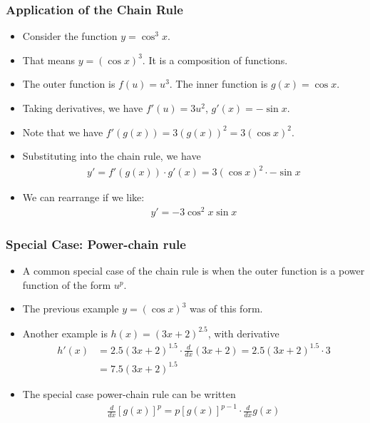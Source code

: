 \documentclass[serif,ignorenonframetext]{beamer}
\begin{document}
\begin{frame}
  \frametitle{Application of the Chain Rule}
  \begin{itemize}[<+->]
  \item Consider the function $y=\cos^3 x$.
  \item That means $y=(\cos x)^3$.  It is a composition of functions.
  \item The outer function is $f(u)=u^3$.  The inner function is $g(x)=\cos x$.
  \item Taking derivatives, we have $f'(u)=3u^2$, $g'(x)=-\sin x$.
  \item Note that we have $f'(g(x))= 3\left(g(x)\right)^2 = 3(\cos x)^2$.
  \item Substituting into the chain rule, we have
    \begin{align*}
      y' = f'(g(x)) \cdot g'(x)
      = 3(\cos x)^2 \cdot -\sin x
    \end{align*}
  \item We can rearrange if we like:
    \begin{align*}
      y' = -3 \cos^2 x \sin x
    \end{align*}
  \end{itemize}
\end{frame}

\begin{frame}
  \frametitle{Special Case: Power-chain rule}
  \begin{itemize}[<+->]
  \item A common special case of the chain rule is when the outer function
    is a power function of the form $u^p$.
  \item The previous example $y= (\cos x)^3$ was of this form.
  \item Another example is $h(x) = (3x+2)^{2.5}$, with derivative
    \begin{align*}
      h'(x)&=2.5(3x+2)^{1.5} \cdot \frac{d}{dx} (3x+2)
      = 2.5(3x+2)^{1.5} \cdot 3 \\
      &= 7.5 (3x+2)^{1.5}
    \end{align*}
  \item The special case power-chain rule can be written
    \begin{align*}
      \frac{d}{dx} [g(x)]^p = p [g(x)]^{p-1} \cdot \frac{d}{dx} g(x)
    \end{align*}
  \end{itemize}
\end{frame}
\end{document}
